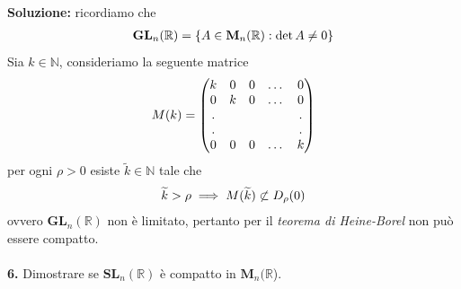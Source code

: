 \documentclass{article}
\begin{document}
\textbf{Soluzione:} ricordiamo che
\begin{gather}
    \mathbf{GL}_n(\mathbb{R}) = \{ A \in \mathbf{M}_n(\mathbb{R}) : \det A \neq 0 \} \notag
\end{gather}
Sia $k \in \mathbb{N}$, consideriamo la seguente matrice
\begin{gather}
    M(k) = \begin{pmatrix}
        k & 0 & 0 & \dots & 0 \\
        0 & k & 0 & \dots & 0 \\
        . & & & & . \\
        . & & & & . \\
        0 & 0 & 0 & \dots & k
    \end{pmatrix} \notag
\end{gather}
per ogni $\rho > 0$ esiste $\widetilde{k} \in \mathbb{N}$ tale che
\begin{gather}
    \widetilde{k} > \rho \implies M(\widetilde{k}) \not\subset D_\rho(0) \notag
\end{gather}
ovvero $\mathbf{GL}_n(\mathbb{R})$ non è limitato, pertanto per il \textit{teorema di Heine-Borel} non può essere compatto. \\ \\
\textbf{6.} Dimostrare se $\textbf{SL}_n(\mathbb{R})$ è compatto in $\mathbf{M}_n(\mathbb{R}$). \\
\end{document}
